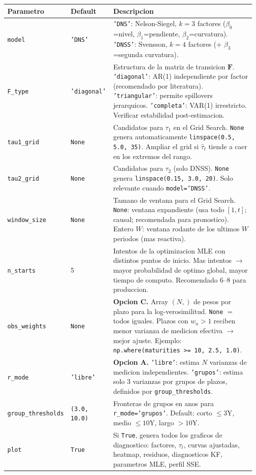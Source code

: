 \documentclass[12pt, a4paper]{article}
\theoremstyle{plain}
\theoremstyle{definition}
\theoremstyle{remark}
\newcommand{\bF}{\mathbf{F}}
\begin{document}
\begin{longtable}{L{3.8cm} L{2cm} L{8.2cm}}
\toprule
\textbf{Parametro} & \textbf{Default} & \textbf{Descripcion} \\
\midrule
\endhead
\bottomrule
\endfoot

\texttt{model} & \texttt{'DNS'} &
  \texttt{'DNS'}: Nelson-Siegel, $k=3$ factores ($\beta_0$=nivel,
  $\beta_1$=pendiente, $\beta_2$=curvatura).
  \texttt{'DNSS'}: Svensson, $k=4$ factores (+ $\beta_3$=segunda curvatura). \\
\addlinespace
\texttt{F\_type} & \texttt{'diagonal'} &
  Estructura de la matriz de transicion $\bF$.
  \texttt{'diagonal'}: AR(1) independiente por factor (recomendado por literatura).
  \texttt{'triangular'}: permite spillovers jerarquicos.
  \texttt{'completa'}: VAR(1) irrestricto. Verificar estabilidad post-estimacion. \\
\addlinespace
\texttt{tau1\_grid} & \texttt{None} &
  Candidatos para $\tau_1$ en el Grid Search.
  \texttt{None} genera automaticamente \texttt{linspace(0.5, 5.0, 35)}.
  Ampliar el grid si $\hat{\tau}_t$ tiende a caer en los extremos del rango. \\
\addlinespace
\texttt{tau2\_grid} & \texttt{None} &
  Candidatos para $\tau_2$ (solo DNSS).
  \texttt{None} genera \texttt{linspace(0.15, 3.0, 20)}.
  Solo relevante cuando \texttt{model='DNSS'}. \\
\addlinespace
\texttt{window\_size} & \texttt{None} &
  Tamano de ventana para el Grid Search.
  \texttt{None}: ventana expandiente (usa todo $[1,t]$; causal; recomendada para pronostico).
  Entero $W$: ventana rodante de los ultimos $W$ periodos (mas reactiva). \\
\addlinespace
\texttt{n\_starts} & 5 &
  Intentos de la optimizacion MLE con distintos puntos de inicio.
  Mas intentos $\to$ mayor probabilidad de optimo global,
  mayor tiempo de computo. Recomendado 6--8 para produccion. \\
\addlinespace
\texttt{obs\_weights} & \texttt{None} &
  \textbf{Opcion C.}
  Array $(N,)$ de pesos por plazo para la log-verosimilitud.
  \texttt{None} $=$ todos iguales.
  Plazos con $w_n > 1$ reciben menor varianza de medicion efectiva $\to$ mejor ajuste.
  Ejemplo: \texttt{np.where(maturities >= 10, 2.5, 1.0)}. \\
\addlinespace
\texttt{r\_mode} & \texttt{'libre'} &
  \textbf{Opcion A.}
  \texttt{'libre'}: estima $N$ varianzas de medicion independientes.
  \texttt{'grupos'}: estima solo 3 varianzas por grupos de plazos,
  definidos por \texttt{group\_thresholds}. \\
\addlinespace
\texttt{group\_thresholds} & \texttt{(3.0, 10.0)} &
  Fronteras de grupos en anos para \texttt{r\_mode='grupos'}.
  Default: corto $\leq 3$Y, medio $\leq 10$Y, largo $> 10$Y. \\
\addlinespace
\texttt{plot} & \texttt{True} &
  Si \texttt{True}, genera todos los graficos de diagnostico:
  factores, $\tau_t$, curvas ajustadas, heatmap,
  residuos, diagnosticos KF, parametros MLE, perfil SSE. \\

\end{longtable}
\end{document}

